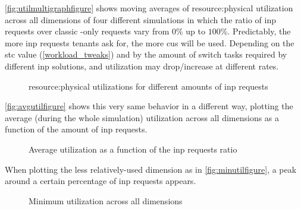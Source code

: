 \autoref{fig:utilmultigraphfigure} shows moving averages of \gls{resource:physical} utilization across all dimensions of four different simulations in which the ratio of \gls{inp} requests over classic -only requests vary from $0\%$ up to $100\%$.
Predictably, the more \gls{inp} requests tenants ask for, the more \glspl{cu} will be used.
Depending on the \gls{stc} value (\autoref{workload_tweaks}) and by the amount of switch tasks required by different \gls{inp} solutions,  and  utilization may drop/increase at different rates.
\begin{figure}[!htb]
    \centering
    \usebox{\utilmultigraphfigure}
    \caption{\Gls{resource:physical} utilizations for different amounts of \gls{inp} requests}
    \label{fig:utilmultigraphfigure}
\end{figure}

\autoref{fig:avgutilfigure} shows this very same behavior in a different way, plotting the average (during the whole simulation)  utilization across all dimensions as a function of the amount of \gls{inp} requests.
\begin{figure}[!htb]
    \centering
    \usebox{\avgutilfigure}
    \caption{Average  utilization as a function of the \gls{inp} requests ratio}
    \label{fig:avgutilfigure}
\end{figure}

When plotting the less relatively-used  dimension as in \autoref{fig:minutilfigure}, a peak around a certain percentage of \gls{inp} requests appears.
\begin{figure}[!htb]
    \centering
    \usebox{\minutilfigure}
    \caption{Minimum  utilization across all dimensions}
    \label{fig:minutilfigure}
\end{figure}

